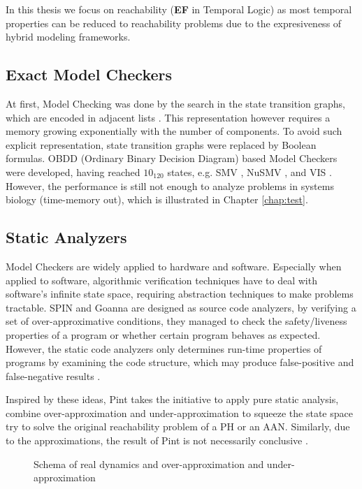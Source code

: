 In this thesis we focus on reachability (\textbf{EF} in Temporal Logic) as most temporal properties can be reduced to reachability problems due to the expresiveness of hybrid modeling frameworks.

\subsection{Exact Model Checkers}
At first, Model Checking was done by the search in the state transition graphs, which are encoded in adjacent lists \cite{clarke1981design}.
This representation however requires a memory growing exponentially with the number of components.
To avoid such explicit representation, state transition graphs were replaced by Boolean formulas.
OBDD (Ordinary Binary Decision Diagram) based Model Checkers were developed, having reached $10_{120}$ states, e.g.
SMV \cite{mcmillan1993symbolic}, NuSMV \cite{cimatti2000nusmv}, and VIS \cite{brayton1996vis}.
However, the performance is still not enough to analyze problems in systems biology (time-memory out), which is illustrated in Chapter \ref{chap:test}.  

\subsection{Static Analyzers}
Model Checkers are widely applied to hardware and software.
Especially when applied to software, algorithmic verification techniques have
to deal with software’s infinite state space, requiring abstraction techniques to make problems tractable.
SPIN \cite{holzmann1997model} and Goanna \cite{fehnker2006goanna} are designed as source code analyzers, by verifying a set of over-approximative conditions, they managed to check the safety/liveness properties of a program or whether certain program behaves as expected. 
However, the static code analyzers only determines run-time properties of programs by examining the code structure, which may produce false-positive and false-negative results \cite{vorobyov2010comparing}.

Inspired by these ideas, Pint \cite{Pint} takes the initiative to apply pure static analysis, combine over-approximation and under-approximation to squeeze the state space try to solve the original reachability problem of a PH or an AAN.
Similarly, due to the approximations, the result of Pint is not necessarily conclusive \cite{folschette2015}.

\begin{figure}
    \centering
    
    \caption[Static analysis]{Schema of real dynamics and over-approximation and under-approximation}
    \label{fig:vennDiagram}
\end{figure}

